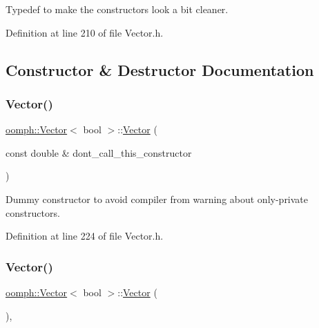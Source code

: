 Typedef to make the constructors look a bit cleaner. 



Definition at line 210 of file Vector.\+h.



\subsection{Constructor \& Destructor Documentation}
\mbox{\label{classoomph_1_1Vector_3_01bool_01_4_a0af85cfa373f0845127ab472de8ea2c3}} 
\subsubsection{\texorpdfstring{Vector()}{Vector()}\hspace{0.1cm}{\footnotesize\ttfamily [1/5]}}
{\footnotesize\ttfamily \hyperlink{classoomph_1_1Vector}{oomph\+::\+Vector}$<$ bool $>$\+::\hyperlink{classoomph_1_1Vector}{Vector} (\begin{DoxyParamCaption}\item[{const double \&}]{dont\+\_\+call\+\_\+this\+\_\+constructor }\end{DoxyParamCaption})\hspace{0.3cm}{\ttfamily [inline]}}



Dummy constructor to avoid compiler from warning about only-\/private constructors. 



Definition at line 224 of file Vector.\+h.

\mbox{\label{classoomph_1_1Vector_3_01bool_01_4_a97b8a9d1eebc8ea041b3ec5561c4ec59}} 
\subsubsection{\texorpdfstring{Vector()}{Vector()}\hspace{0.1cm}{\footnotesize\ttfamily [2/5]}}
{\footnotesize\ttfamily \hyperlink{classoomph_1_1Vector}{oomph\+::\+Vector}$<$ bool $>$\+::\hyperlink{classoomph_1_1Vector}{Vector} (\begin{DoxyParamCaption}{ }\end{DoxyParamCaption})\hspace{0.3cm}{\ttfamily [inline]}, {\ttfamily [private]}}



